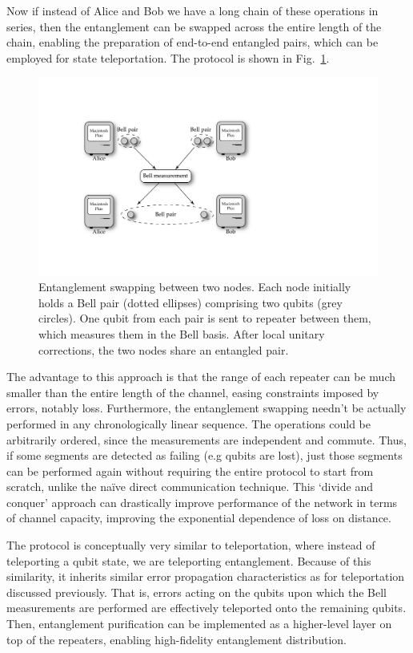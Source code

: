 \documentclass[aps,rmp,twocolumn,amsmath,amssymb,nofootinbib,superscriptaddress,longbibliography,floatfix]{revtex4-1}
\begin{document}
Now if instead of Alice and Bob we have a long chain of these operations in series, then the entanglement can be swapped across the entire length of the chain, enabling the preparation of end-to-end entangled pairs, which can be employed for state teleportation. The protocol is shown in Fig.~\ref{fig:ent_swap}.

\begin{figure}[!htb]
\includegraphics[width=\columnwidth]{ent_swap}
\caption{Entanglement swapping between two nodes. Each node initially holds a Bell pair (dotted ellipses) comprising two qubits (grey circles). One qubit from each pair is sent to repeater between them, which measures them in the Bell basis. After local unitary corrections, the two nodes share an entangled pair.} \label{fig:ent_swap}
\end{figure}

The advantage to this approach is that the range of each repeater can be much smaller than the entire length of the channel, easing constraints imposed by errors, notably loss. Furthermore, the entanglement swapping needn't be actually performed in any chronologically linear sequence. The operations could be arbitrarily ordered, since the measurements are independent and commute. Thus, if some segments are detected as failing (e.g qubits are lost), just those segments can be performed again without requiring the entire protocol to start from scratch, unlike the na{\" i}ve direct communication technique. This `divide and conquer' approach can drastically improve performance of the network in terms of channel capacity, improving the exponential dependence of loss on distance. 

The protocol is conceptually very similar to teleportation, where instead of teleporting a qubit state, we are teleporting entanglement. Because of this similarity, it inherits similar error propagation characteristics as for teleportation discussed previously. That is, errors acting on the qubits upon which the Bell measurements are performed are effectively teleported onto the remaining qubits. Then, entanglement purification can be implemented as a higher-level layer on top of the repeaters, enabling high-fidelity entanglement distribution.
\end{document}
